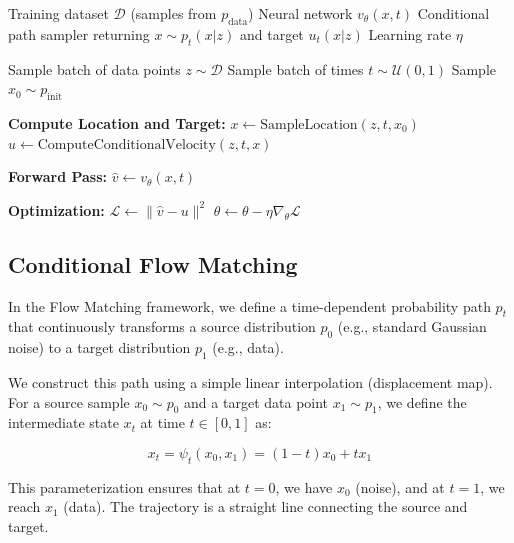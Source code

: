 \documentclass{book}
\begin{document}
\begin{algorithm}
\caption{Conditional Flow Matching Training Loop}
\label{alg:cfm_training}
\begin{algorithmic}[1]
\Require Training dataset $\mathcal{D}$ (samples from $p_{\text{data}}$)
\Require Neural network $v_\theta(x, t)$
\Require Conditional path sampler returning $x \sim p_t(x|z)$ and target $u_t(x|z)$
\Require Learning rate $\eta$

    \State Sample batch of data points $z \sim \mathcal{D}$
    \State Sample batch of times $t \sim \mathcal{U}(0, 1)$
    \State Sample $x_0 \sim p_{\text{init}}$

    \State \textbf{Compute Location and Target:}
    \State $x \leftarrow \text{SampleLocation}(z, t, x_0)$ 
    \State $u \leftarrow \text{ComputeConditionalVelocity}(z, t, x)$ 

    \State \textbf{Forward Pass:}
    \State $\hat{v} \leftarrow v_\theta(x, t)$

    \State \textbf{Optimization:}
    \State $\mathcal{L} \leftarrow \| \hat{v} - u \|^2$ 
    \State $\theta \leftarrow \theta - \eta \nabla_\theta \mathcal{L}$ 
\EndWhile
\end{algorithmic}
\end{algorithm}


\subsection{Conditional Flow Matching}

In the Flow Matching framework, we define a time-dependent probability path $p_t$ that continuously transforms a source distribution $p_0$ (e.g., standard Gaussian noise) to a target distribution $p_1$ (e.g., data).

We construct this path using a simple linear interpolation (displacement map). For a source sample $x_0 \sim p_0$ and a target data point $x_1 \sim p_1$, we define the intermediate state $x_t$ at time $t \in [0, 1]$ as:

\begin{equation} \label{eq:fm_path}
x_t = \psi_t(x_0, x_1) = (1 - t) x_0 + t x_1
\end{equation}

This parameterization ensures that at $t=0$, we have $x_0$ (noise), and at $t=1$, we reach $x_1$ (data). The trajectory is a straight line connecting the source and target.
\end{document}
